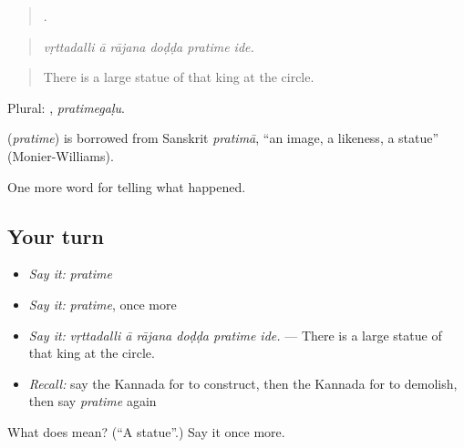 \begin{quote}
     .
\end{quote}

\begin{quote}
\emph{vṛttadalli ā rājana doḍḍa pratime ide.}
\end{quote}

\begin{quote}
There is a large statue of that king at the circle.
\end{quote}

Plural: , \emph{pratimegaḷu}.

\begin{cousinweb}
\textbf{} (\emph{pratime}) is borrowed from Sanskrit \emph{pratimā}, \textquotedblleft{}an image, a likeness, a statue\textquotedblright{} (Monier-Williams).
\end{cousinweb}

\begin{grammarlens}[title={What you've built}]
One more word for telling what happened.
\end{grammarlens}

\subsection*{Your turn}
\begin{itemize}
\raggedright
  \item \emph{Say it:} \emph{pratime}
  \item \emph{Say it:} \emph{pratime}, once more
  \item \emph{Say it:} \emph{vṛttadalli ā rājana doḍḍa pratime ide.} — There is a large statue of that king at the circle.
  \item \emph{Recall:} say the Kannada for to construct, then the Kannada for to demolish, then say \emph{pratime} again
\end{itemize}

\begin{tcolorbox}[breakable,colback=teal!4,colframe=teal!35!black,title={Before you move on}]
What does  mean? (\textquotedblleft{}A statue\textquotedblright{}.) Say it once more.
\end{tcolorbox}
